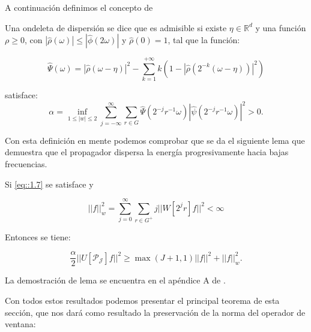\noindent A continuación definimos el concepto de 
\begin{definicion}
  Una ondeleta de dispersión se dice que es admisible si existe $\eta \in \mathbb{R}^d$ y una función $\rho \geq 0$, con $|\widehat{\rho}(\omega)| \leq |\widehat{\phi}(2\omega)|$ y $\widehat{\rho}(0)=1$, tal que la función: 

\begin{equation}\label{eq::1.6}
  \widehat{\Psi}(\omega)=|\widehat{\rho}(\omega - \eta)|^2 - \sum_{k=1}^{+\infty} k(1-|\widehat{\rho}(2^{-k}(\omega - \eta))|^2)
\end{equation}
  
\noindent satisface: 
\begin{equation} \label{eq::1.7}
  \alpha= \inf_{1\leq|w|\leq2} \sum_{j=-\infty}^{\infty} \sum_{r\in G} \widehat{\Psi} (2^{-j}r^{-1}\omega)|\widehat{\psi}(2^{-j}r^{-1}\omega)|^2>0.
\end{equation}

\end{definicion}

\noindent Con esta definición en mente podemos comprobar que se da el siguiente lema que demuestra que el propagador dispersa la energía progresivamente hacia bajas frecuencias.

\begin{lema} \label{lema::Admisibilidad}
Si \eqref{eq::1.7} se satisface y 

\begin{equation}
  ||f||_w^2=\sum_{j=0}^\infty \sum_{r\in G^+} j ||W[2^j r] f||^2 < \infty
\end{equation}

\noindent Entonces se tiene: 

\begin{equation}\label{eq::1.9}
  \frac{\alpha}{2}||U[\mathcal{P_J}]f||^2 \geq \max (J+1,1) ||f||^2 + ||f||_w^2.
\end{equation}

\end{lema}

\medskip

\noindent La demostración de lema se encuentra en el apéndice A de \cite{GroupInvariantScattering}.

\medskip

\noindent Con todos estos resultados podemos presentar el principal teorema de esta sección, que nos dará como resultado la preservación de la norma del operador de ventana:


